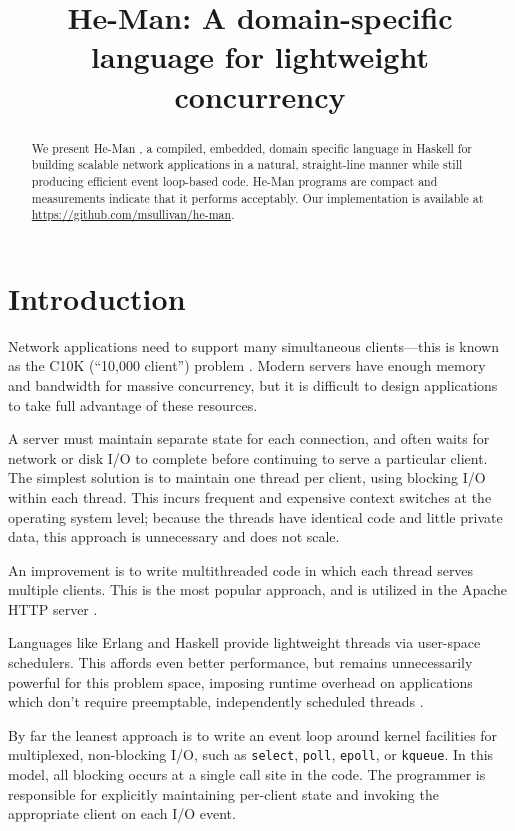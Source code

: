 \documentclass[preprint]{sigplanconf}
\title{He-Man: A domain-specific language for lightweight concurrency}
\renewcommand{\t}{\texttt}
\begin{document}
\maketitle


\begin{abstract}

We present He-Man \cite{HeMan}, a compiled, embedded, domain specific language in Haskell for
building scalable network applications in a natural, straight-line manner while
still producing efficient event loop-based code. He-Man programs are compact and
measurements indicate that it performs acceptably. Our implementation is
available at
\url{https://github.com/msullivan/he-man}.
\end{abstract}

\section{Introduction}

Network applications need to support many simultaneous clients---this is known
as the C10K (``10,000 client'') problem \cite{Kegel}. Modern servers have enough
memory and bandwidth for massive concurrency, but it is difficult to design
applications to take full advantage of these resources.

A server must maintain separate state for each connection, and often waits for
network or disk I/O to complete before continuing to serve a particular client.
The simplest solution is to maintain one thread per client, using blocking I/O
within each thread. This incurs frequent and expensive context switches at the
operating system level; because the threads have identical code and little
private data, this approach is unnecessary and does not scale.

An improvement is to write multithreaded code in which each thread serves
multiple clients. This is the most popular approach, and is utilized in the
Apache HTTP server \cite{Apache}.

Languages like Erlang and Haskell provide lightweight threads via user-space
schedulers. This affords even better performance, but remains unnecessarily
powerful for this problem space, imposing runtime overhead on applications which
don't require preemptable, independently scheduled threads \cite{Vinoski}.

By far the leanest approach is to write an event loop around kernel facilities
for multiplexed, non-blocking I/O, such as \t{select}, \t{poll}, \t{epoll}, or
\t{kqueue}. In this model, all blocking occurs at a single call site in the
code. The programmer is responsible for explicitly maintaining per-client state
and invoking the appropriate client on each I/O event.
\end{document}
